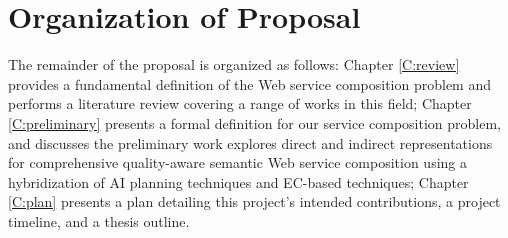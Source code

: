 \section{Organization of Proposal}The remainder of the proposal is organized as follows: Chapter \ref{C:review} provides a fundamental definition of the Web service composition problem and performs a literature review covering a range of works in this field; Chapter \ref{C:preliminary} presents a formal definition for our service composition problem, and discusses the preliminary work explores direct and indirect representations for comprehensive quality-aware semantic Web service composition using a hybridization of AI planning techniques and EC-based techniques; Chapter \ref{C:plan} presents a plan detailing this project's intended contributions, a project timeline, and a thesis outline.
